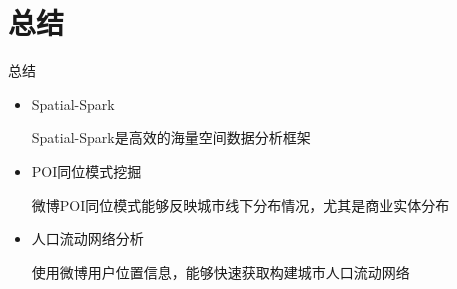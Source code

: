 \section{总结}

\begin{frame}[c]{总结}
\begin{itemize}
    \item \alert{Spatial-Spark}

    Spatial-Spark是高效的海量空间数据分析框架

    \item \alert{POI同位模式挖掘}

    微博POI同位模式能够反映城市线下分布情况，尤其是商业实体分布

    \item \alert{人口流动网络分析}

    使用微博用户位置信息，能够快速获取构建城市人口流动网络

\end{itemize}
\end{frame}


